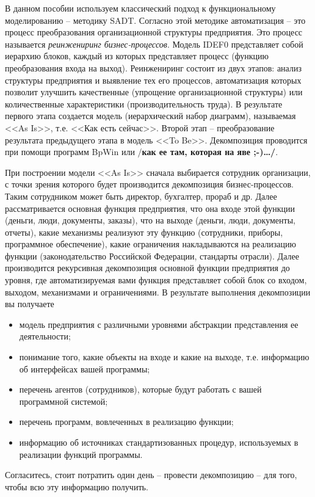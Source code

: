\documentclass[a4paper,14pt,final]{extreport}
\newcommand{\aaa}[1]{{/\bfseries #1\ldots/}}
\begin{document}
В данном пособии используем классический подход к функциональному моделированию -- методику SADT.  Согласно этой методике автоматизация -- это процесс преобразования организационной структуры предприятия.   Это процесс называется \emph{реинжениринг бизнес-процессов}.  Модель IDEF0 представляет собой иерархию блоков, каждый из которых представляет процесс (функцию преобразования входа на выход).  Реинжениринг состоит из двух этапов: анализ структуры предприятия и выявление тех его процессов, автоматизация которых позволит улучшить качественные (упрощение организационной структуры) или количественные характеристики (производительность труда).  В результате первого этапа создается модель (иерархический набор диаграмм), называемая <<As Is>>, т.е. <<Как есть сейчас>>.   Второй этап -- преобразование результата предыдущего этапа в модель <<To Be>>.  Декомпозиция проводится при помощи программ BpWin \cite{bpwin} или \aaa{как ее там, которая на яве ;-)\cite{rrrrr}}.

При построении модели <<As Is>> сначала выбирается сотрудник организации, с точки зрения которого будет производится декомпозиция бизнес-процессов.  Таким сотрудником может быть директор, бухгалтер, прораб и др.  Далее рассматривается основная функция предприятия, что она входе этой функции (деньги, люди, документы, заказы), что на выходе (деньги, люди, документы, отчеты), какие механизмы реализуют эту функцию (сотрудники, приборы, программное обеспечение), какие ограничения накладываются на реализацию функции (законодательство Российской Федерации, стандарты отрасли).  Далее производится рекурсивная декомпозиция основной функции предприятия до уровня, где автоматизируемая вами функция представляет собой блок со входом, выходом, механизмами и ограничениями.  В результате выполнения декомпозиции вы получаете
\begin{itemize}
\item модель предприятия с различными уровнями абстракции
  представления ее деятельности;
\item понимание того, какие объекты на входе и какие на выходе, т.е. информацию об интерфейсах вашей программы;
\item перечень агентов (сотрудников), которые будут работать с вашей программной системой;
\item перечень программ, вовлеченных в реализацию функции;
\item информацию об источниках стандартизованных процедур, используемых в реализации функций программы.
\end{itemize}
Согласитесь, стоит потратить один день -- провести декомпозицию -- для того, чтобы всю эту информацию получить.
\end{document}
